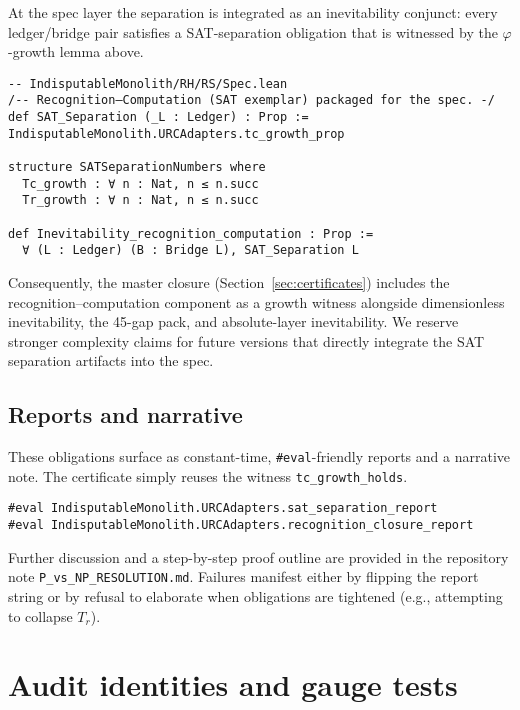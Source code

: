 \documentclass[11pt,a4paper,twoside]{article}
\numberwithin{equation}{section}
\theoremstyle{customthm}
\theoremstyle{customdef}
\theoremstyle{customrem}
\begin{document}
At the spec layer the separation is integrated as an inevitability conjunct: every ledger/bridge pair satisfies a SAT-separation obligation that is witnessed by the \(\varphi\)-growth lemma above.

\begin{lstlisting}
-- IndisputableMonolith/RH/RS/Spec.lean
/-- Recognition–Computation (SAT exemplar) packaged for the spec. -/
def SAT_Separation (_L : Ledger) : Prop := IndisputableMonolith.URCAdapters.tc_growth_prop

structure SATSeparationNumbers where
  Tc_growth : ∀ n : Nat, n ≤ n.succ
  Tr_growth : ∀ n : Nat, n ≤ n.succ

def Inevitability_recognition_computation : Prop :=
  ∀ (L : Ledger) (B : Bridge L), SAT_Separation L
\end{lstlisting}

Consequently, the master closure (Section~\ref{sec:certificates}) includes the recognition–computation component as a growth witness alongside dimensionless inevitability, the 45-gap pack, and absolute-layer inevitability. We reserve stronger complexity claims for future versions that directly integrate the SAT separation artifacts into the spec.

\subsection{Reports and narrative}\label{subsec:pn-reports}

These obligations surface as constant-time, \texttt{\#eval}-friendly reports and a narrative note. The certificate simply reuses the witness \texttt{tc\_growth\_holds}.

\begin{lstlisting}
#eval IndisputableMonolith.URCAdapters.sat_separation_report
#eval IndisputableMonolith.URCAdapters.recognition_closure_report
\end{lstlisting}

Further discussion and a step-by-step proof outline are provided in the repository note \texttt{P\_vs\_NP\_RESOLUTION.md}. Failures manifest either by flipping the report string or by refusal to elaborate when obligations are tightened (e.g., attempting to collapse \(T_r\)).

\section{Audit identities and gauge tests}\label{sec:audit}
\end{document}
